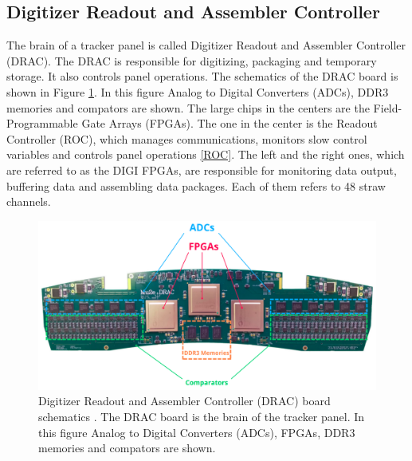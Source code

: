 \subsection{Digitizer Readout and Assembler Controller}
The brain of a tracker panel is called Digitizer Readout and Assembler Controller (DRAC). The DRAC is responsible for digitizing, packaging and temporary storage. It also controls panel operations. The schematics of the DRAC board is shown in Figure \ref{fig:drac}. In this figure Analog to Digital Converters (ADCs), DDR3 memories and compators are shown. The large chips in the centers are the Field-Programmable Gate Arrays (FPGAs). The one in the center is the Readout Controller (ROC), which manages communications, monitors slow control variables and controls panel operations \ref{ROC}. The left and the right ones, which are referred to as the DIGI FPGAs, are responsible for monitoring data output, buffering data and assembling data packages. Each of them refers to 48 straw channels. 
\begin{figure}[!h]
\centering
\includegraphics[width =\textwidth]{figures/png/Screenshot_20240204_115052.png}
\caption{Digitizer Readout and Assembler Controller (DRAC) board schematics \cite{drac}. The DRAC board is the brain of the tracker panel. In this figure Analog to Digital Converters (ADCs), FPGAs, DDR3 memories and compators are shown.}
\label{fig:drac}
\end{figure}

